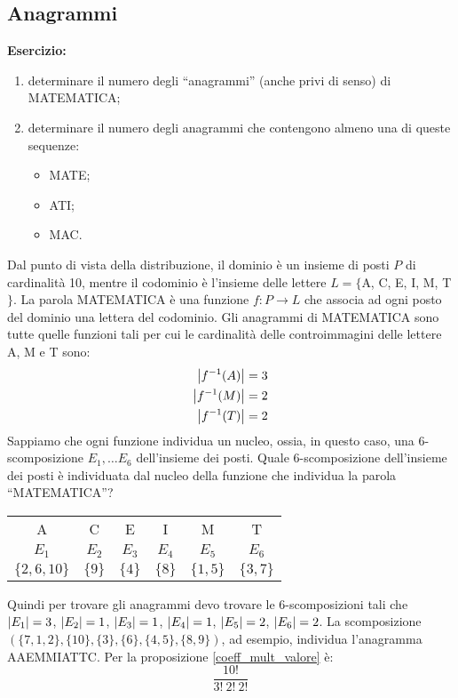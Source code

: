 \subsection{Anagrammi}

\textbf{Esercizio:} 
\begin{enumerate}
  \item determinare il numero degli ``anagrammi'' (anche privi di senso) di MATEMATICA;
  \item determinare il numero degli anagrammi che contengono almeno una di queste sequenze:
  \begin{itemize}
    \item MATE;
    \item ATI;
    \item MAC.
  \end{itemize}
\end{enumerate}

Dal punto di vista della distribuzione, il dominio \`e un insieme di posti $P$ di cardinalit\`a 10, mentre il codominio \`e l'insieme delle lettere $L = \{ $A, C, E, I, M, T$\}$. La parola MATEMATICA \`e una funzione $f : P \to L $ che associa ad ogni posto del dominio una lettera del codominio. Gli anagrammi di MATEMATICA sono tutte quelle funzioni tali per cui le cardinalit\`a delle controimmagini delle lettere A, M e T sono: 
\begin{align*}
\left\lvert{f^{-1}(A)}\right\rvert = 3 \\ 
\left\lvert{f^{-1}(M)}\right\rvert = 2 \\
\left\lvert{f^{-1}(T)}\right\rvert = 2
\end{align*}
Sappiamo che ogni funzione individua un nucleo, ossia, in questo caso, una $6$-scomposizione $E_1, \dots E_6$ dell'insieme dei posti. Quale $6$-scomposizione dell'insieme dei posti \`e individuata dal nucleo della funzione che individua la parola ``MATEMATICA''?
\begin{table}[ht]
\centering
\begin{tabular}{c|c|c|c|c|c}
A & C & E & I & M & T \\
$E_1$ & $E_2$ & $E_3$ & $E_4$ & $E_5$ & $E_6$ \\
$\{2, 6, 10\}$ & $\{9\}$ & $\{4\}$ & $\{8\}$ & $\{1,5\}$ & $\{3,7\}$ 
\end{tabular}
\end{table}
Quindi per trovare gli anagrammi devo trovare le $6$-scomposizioni tali che $\left\lvert{E_1}\right\rvert = 3$, $\left\lvert{E_2}\right\rvert = 1$, $\left\lvert{E_3}\right\rvert = 1$, $\left\lvert{E_4}\right\rvert = 1$, $\left\lvert{E_5}\right\rvert = 2$, $\left\lvert{E_6}\right\rvert = 2$. La scomposizione $( \{ 7, 1, 2\}, \{ 10\}, \{3\}, \{ 6\}, \{4, 5\}, \{8,9\})$, ad esempio, individua l'anagramma AAEMMIATTC. Per la proposizione \ref{coeff_mult_valore} \`e:
\[
\frac{10!}{3! \ 2! \ 2!}
\]

